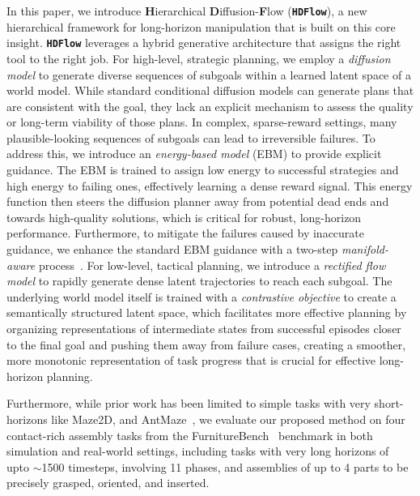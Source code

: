 \documentclass{article} %
\begin{document}
In this paper, we introduce \textbf{H}ierarchical \textbf{D}iffusion-\textbf{F}low (\texttt{\textbf{HDFlow}}), a new hierarchical framework for long-horizon manipulation that is built on this core insight. \texttt{\textbf{HDFlow}} leverages a hybrid generative architecture that assigns the right tool to the right job. For high-level, strategic planning, we employ a \textit{diffusion model} to generate diverse sequences of subgoals within a learned latent space of a world model. While standard conditional diffusion models can generate plans that are consistent with the goal, they lack an explicit mechanism to assess the quality or long-term viability of those plans. In complex, sparse-reward settings, many plausible-looking sequences of subgoals can lead to irreversible failures. To address this, we introduce an \textit{energy-based model} (EBM) to provide explicit guidance. The EBM is trained to assign low energy to successful strategies and high energy to failing ones, effectively learning a dense reward signal. This energy function then steers the diffusion planner away from potential dead ends and towards high-quality solutions, which is critical for robust, long-horizon performance. Furthermore, to mitigate the failures caused by inaccurate guidance, we
enhance the standard EBM guidance with a two-step \textit{manifold-aware} process~\citep{lee2025local}. For low-level, tactical planning, we introduce a \textit{rectified flow model} to rapidly generate dense latent trajectories to reach each subgoal. The underlying world model itself is trained with a \textit{contrastive objective} to create a semantically structured latent space, which facilitates more effective planning by organizing representations of intermediate states from successful episodes closer to the final goal and pushing them away from failure cases, creating a smoother, more monotonic representation of task progress that is crucial for effective long-horizon planning.

Furthermore, while prior work has been limited to simple tasks with very short-horizons like Maze2D, and AntMaze~\citep{fu2020d4rl}, we evaluate our proposed method on four contact-rich assembly tasks from the FurnitureBench~\citep{heo2025furniturebench} benchmark in both simulation and real-world settings, including tasks with very long horizons of upto $\sim$1500 timesteps, involving 11 phases, and assemblies of up to 4 parts to be precisely grasped, oriented, and inserted. 
\end{document}
